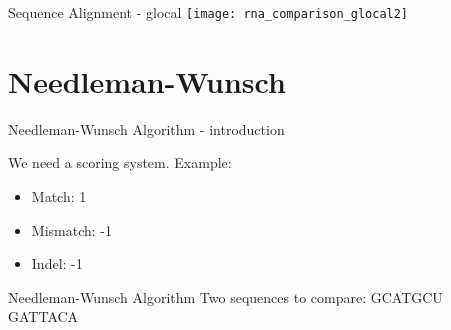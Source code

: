 \begin{frame}[c]{Sequence Alignment - glocal}
    \texttt{[image: rna\_comparison\_glocal2]}
\end{frame}


\section{Needleman-Wunsch}


\begin{frame}[c]{Needleman-Wunsch Algorithm - introduction}

    We need a scoring system. \newline \newline
    \pause
    Example: \pause
    \begin{itemize}
    \item Match: 1
    \item Mismatch: -1
    \item Indel: -1
    \end{itemize}

\end{frame}


\begin{frame}[c]{Needleman-Wunsch Algorithm}
    Two sequences to compare: \newline \newline
    \pause
    GCATGCU \newline
    GATTACA
\end{frame}

